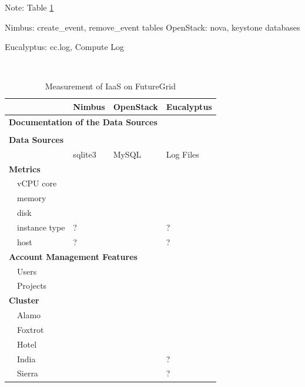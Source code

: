 \documentclass{tex/sig-alternate}
\begin{document}
{Note:
Table \ref{T:compare-iaas}

    Nimbus: create\_event, remove\_event tables 
    OpenStack: nova, keystone  databases 

    Eucalyptus: cc.log, Compute Log 


\newcommand{\YES}{\ding{51}}

\newcommand{\NO}{\ding{55}}


\begin{table}[h!]
  \caption{Measurement of IaaS on FutureGrid}\label{T:compare-iaas}
  ~\\
  \begin{small}
  \begin{tabularx}{\columnwidth}{|l|X|X|X|}
  \hline
                 & {\bf Nimbus} & {\bf OpenStack} & {\bf Eucalyptus} \\
    \hline
    \hline
    \multicolumn{4}{|l|}{\bf Documentation of the Data Sources} \\
    \hline
       & \NO & \YES & \YES \\
    \hline
    \hline
    \multicolumn{4}{|l|}{\bf Data Sources} \\
    \hline
         & sqlite3 & MySQL & Log Files \\
    \hline
    \hline
    \multicolumn{4}{|l|}{\bf Metrics} \\
    \hline
    ~~vCPU core & \YES & \YES & \YES \\
    ~~memory & \YES & \YES & \YES \\
    ~~disk & \YES & \YES & \YES \\
    ~~instance type   & \NO? & \YES & \NO? \\
    ~~host & \NO? & \YES & \NO? \\
    \hline
    \hline
    \multicolumn{4}{|l|}{\bf Account Management Features} \\
    \hline
    ~~Users     & \YES & \YES & \YES \\
    ~~Projects & \NO & \YES & \YES \\
    \hline
    \hline
    \multicolumn{4}{|l|}{\bf Cluster} \\
    \hline
    ~~Alamo  & \YES & \YES & \YES \\
    ~~Foxtrot & \YES & \NO & \NO \\
    ~~Hotel    & \YES & \YES & \NO \\
    ~~India     & \NO  & \YES & \YES? \\
    ~~Sierra    & \NO & \YES & \YES? \\

\end{tabularx}
\end{small}
\end{table}}
\end{document}
